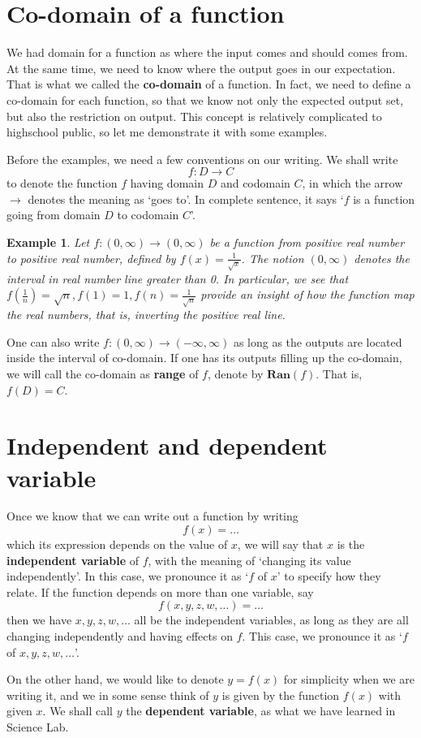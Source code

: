 \documentclass[12pt]{article}
\newtheorem*{example}{Example}
\begin{document}
    \section*{Co-domain of a function}
    We had domain for a function as where the input comes and should comes from. At the same time, we need to know where the output goes in our expectation. That is what we called the \textbf{co-domain} of a function. In fact, we need to define a co-domain for each function, so that we know not only the expected output set, but also the restriction on output. This concept is relatively complicated to highschool public, so let me demonstrate it with some examples.

    Before the examples, we need a few conventions on our writing. We shall write $$f:D\to C$$ to denote the function $f$ having domain $D$ and codomain $C$, in which the arrow $\to$ denotes the meaning as `goes to'. In complete sentence, it says `$f$ is a function going from domain $D$ to codomain $C$'.

    \begin{example}
        Let $f:(0,\infty)\to(0,\infty)$ be a function from positive real number to positive real number, defined by $f(x)=\frac{1}{\sqrt{x}}$. The notion $(0,\infty)$ denotes the interval in real number line greater than 0. In particular, we see that $f(\frac{1}{n})=\sqrt{n},f(1)=1,f(n)=\frac{1}{\sqrt{n}}$ provide an insight of how the function map the real numbers, that is, inverting the positive real line.
    \end{example}

    One can also write $f:(0,\infty)\to(-\infty,\infty)$ as long as the outputs are located inside the interval of co-domain. If one has its outputs filling up the co-domain, we will call the co-domain as \textbf{range} of $f$, denote by $\textbf{Ran}(f)$. That is, $f(D)=C$. 

    \section*{Independent and dependent variable}
    Once we know that we can write out a function by writing $$f(x)=\dots$$ which its expression depends on the value of $x$, we will say that $x$ is the \textbf{independent variable} of $f$, with the meaning of `changing its value independently'. In this case, we pronounce it as `$f$ of $x$' to specify how they relate. If the function depends on more than one variable, say $$f(x,y,z,w,\dots)=\dots$$ then we have $x,y,z,w,\dots$ all be the independent variables, as long as they are all changing independently and having effects on $f$. This case, we pronounce it as `$f$ of $x,y,z,w,\dots$'.

    On the other hand, we would like to denote $y=f(x)$ for simplicity when we are writing it, and we in some sense think of $y$ is given by the function $f(x)$ with given $x$. We shall call $y$ the \textbf{dependent variable}, as what we have learned in Science Lab.
\end{document}
